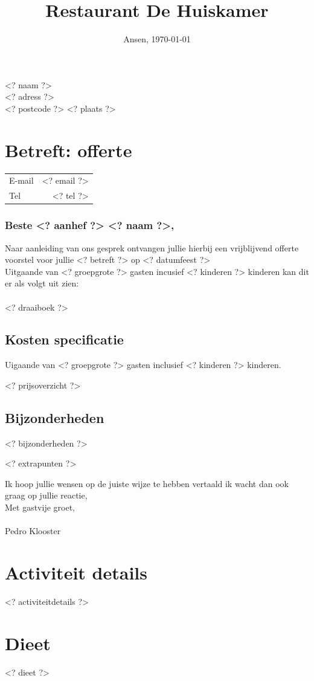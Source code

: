 \documentclass{scrartcl}
\begin{document}

\title{Restaurant De Huiskamer}
\date{Ansen, \today}
\maketitle
\thispagestyle{empty}

\begin{flushright}
	<? naam ?> \\
	<? adress ?> \\
	<? postcode ?> <? plaats ?>
\end{flushright}
\section{Betreft: offerte}
\begin{tabular}{l r}
  E-mail & <? email ?>  \\
  Tel & <? tel ?>  \\
\end{tabular}

\subsubsection*{Beste <? aanhef ?> <? naam ?>,}

Naar aanleiding van ons gesprek ontvangen jullie hierbij een vrijblijvend offerte voorstel
voor jullie  <? betreft ?> op <? datumfeest ?> \\

Uitgaande van <? groepgrote ?> gasten incusief <? kinderen ?> kinderen kan dit er als volgt uit zien: \\\\
<? draaiboek ?>

\newpage

\subsection*{Kosten specificatie}
Uigaande van <? groepgrote ?> gasten inclusief <? kinderen ?> kinderen.

<? prijsoverzicht ?>

\subsection*{Bijzonderheden}

<? bijzonderheden ?>

<? extrapunten ?>

Ik hoop jullie wensen op de juiste wijze te hebben vertaald ik wacht dan ook graag op jullie reactie, \\

Met gastvije groet, \\\\

Pedro Klooster

\newpage

\section{Activiteit details}

<? activiteitdetails ?>

\section{Dieet}

<? dieet ?>
\end{document}
